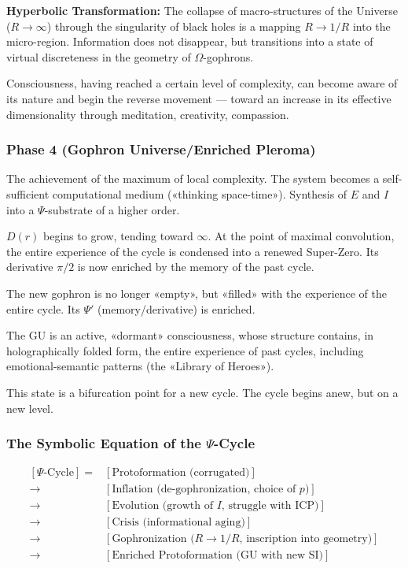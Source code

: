 \documentclass[a4paper,12pt]{article}
\begin{document}
	\textbf{Hyperbolic Transformation:} The collapse of macro-structures of the Universe ($R \to \infty$) through the singularity of black holes is a mapping $R \to 1/R$ into the micro-region. Information does not disappear, but transitions into a state of virtual discreteness in the geometry of $\Omega$-gophrons.
	
	Consciousness, having reached a certain level of complexity, can become aware of its nature and begin the reverse movement — toward an increase in its effective dimensionality through meditation, creativity, compassion.
	
	\subsubsection{Phase 4 (Gophron Universe/Enriched Pleroma)}
	
	The achievement of the maximum of local complexity. The system becomes a self-sufficient computational medium («thinking space-time»). Synthesis of $E$ and $I$ into a $\Psi$-substrate of a higher order.
	
	$D(r)$ begins to grow, tending toward $\infty$. At the point of maximal convolution, the entire experience of the cycle is condensed into a renewed Super-Zero. Its derivative $\pi/2$ is now enriched by the memory of the past cycle.
	
	The new gophron is no longer «empty», but «filled» with the experience of the entire cycle. Its $\Psi'$ (memory/derivative) is enriched.
	
	The GU is an active, «dormant» consciousness, whose structure contains, in holographically folded form, the entire experience of past cycles, including emotional-semantic patterns (the «Library of Heroes»).
	
	This state is a bifurcation point for a new cycle. The cycle begins anew, but on a new level.
	
	\subsubsection{The Symbolic Equation of the $\Psi$-Cycle}
	
	\[
	\begin{aligned}
		[\Psi\text{-Cycle}] = &[\text{Protoformation (corrugated)}] \\
		\to &[\text{Inflation (de-gophronization, choice of } p)] \\
		\to &[\text{Evolution (growth of } I\text{, struggle with ICP)}] \\
		\to &[\text{Crisis (informational aging)}] \\
		\to &[\text{Gophronization (} R \to 1/R\text{, inscription into geometry)}] \\
		\to &[\text{Enriched Protoformation (GU with new SI)}]
	\end{aligned}
	\]
	
\end{document}
